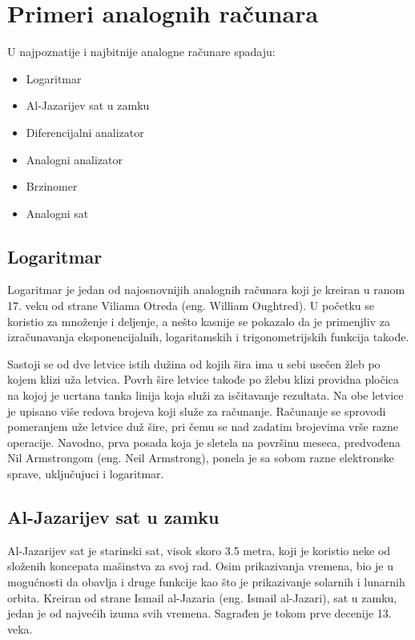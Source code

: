 \documentclass[a4paper]{article}
\begin{document}
{\section{Primeri analognih računara}
\label{sec:naslov1}

U najpoznatije i najbitnije analogne računare spadaju:
	\begin{itemize}
		\item Logaritmar
		\item Al-Jazarijev sat u zamku
 		\item Diferencijalni analizator
		\item Analogni analizator
		\item Brzinomer
		\item Analogni sat
	\end{itemize}

\subsection{Logaritmar}
\label{subsec:podnaslov1}

Logaritmar je jedan od najosnovnijih analognih računara koji je kreiran u ranom 17. veku od strane Viliama Otreda (eng. William Oughtred). U početku se koristio za množenje i deljenje, a nešto kasnije se pokazalo da je primenjliv za izračunavanja eksponencijalnih, logaritamskih i trigonometrijskih funkcija takođe.

Sastoji se od dve letvice istih dužina od kojih šira ima u sebi usečen žleb po kojem klizi uža letvica. Povrh šire letvice takođe po žlebu klizi providna pločica na kojoj je ucrtana tanka linija koja služi za isčitavanje rezultata. Na obe letvice je upisano više redova brojeva koji služe za računanje.
Računanje se sprovodi pomeranjem uže letvice duž šire, pri čemu se nad zadatim brojevima vrše razne operacije.
Navodno, prva posada koja je sletela na površinu meseca, predvođena Nil Armstrongom (eng. Neil Armstrong), ponela je sa sobom razne elektronske sprave, uključujuci i logaritmar.

\subsection{Al-Jazarijev sat u zamku}
\label{subsec:podnaslov2}

Al-Jazarijev sat je starinski sat, visok skoro 3.5 metra, koji je koristio neke od složenih koncepata mašinstva za svoj rad. Osim prikazivanja vremena, bio je u mogućnosti da obavlja i druge funkcije kao što je prikazivanje solarnih i lunarnih orbita. Kreiran od strane Ismail al-Jazaria (eng. Ismail al-Jazari), sat u zamku, jedan je od najvećih izuma svih vremena. Sagrađen je tokom prve decenije 13. veka. 

}
\end{document}
